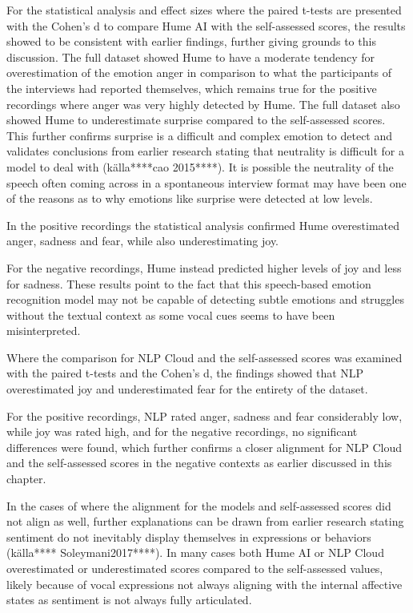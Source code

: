 For the statistical analysis and effect sizes where the paired t-tests are presented with the Cohen’s d to compare Hume AI with the self-assessed scores, the results showed to be consistent with earlier findings, further giving grounds to this discussion. 
The full dataset showed Hume to have a moderate tendency for overestimation of the emotion anger in comparison to what the participants of the interviews had reported themselves, which remains true for the positive recordings where anger was very highly detected by Hume. The full dataset also showed Hume to underestimate surprise compared to the self-assessed scores. This further confirms surprise is a difficult and complex emotion to detect and validates conclusions from earlier research stating that neutrality is difficult for a model to deal with (källa****cao 2015****). It is possible the neutrality of the speech often coming across in a spontaneous interview format may have been one of the reasons as to why emotions like surprise were detected at low levels.

In the positive recordings the statistical analysis confirmed Hume overestimated anger, sadness and fear, while also underestimating joy. 

For the negative recordings, Hume instead predicted higher levels of joy and less for sadness. These results point to the fact that this speech-based emotion recognition model may not be capable of detecting subtle emotions and struggles without the textual context as some vocal cues seems to have been misinterpreted.

Where the comparison for NLP Cloud and the self-assessed scores was examined with the paired t-tests and the Cohen’s d, the findings showed that NLP overestimated joy and underestimated fear for the entirety of the dataset.

For the positive recordings, NLP rated anger, sadness and fear considerably low, while joy was rated high, and for the negative recordings, no significant differences were found, which further confirms a closer alignment for NLP Cloud and the self-assessed scores in the negative contexts as earlier discussed in this chapter.

In the cases of where the alignment for the models and self-assessed scores did not align as well, further explanations can be drawn from earlier research stating sentiment do not inevitably display themselves in expressions or behaviors (källa**** Soleymani2017****). In many cases both Hume AI or NLP Cloud overestimated or underestimated scores compared to the self-assessed values, likely because of vocal expressions not always aligning with the internal affective states as sentiment is not always fully articulated. 
